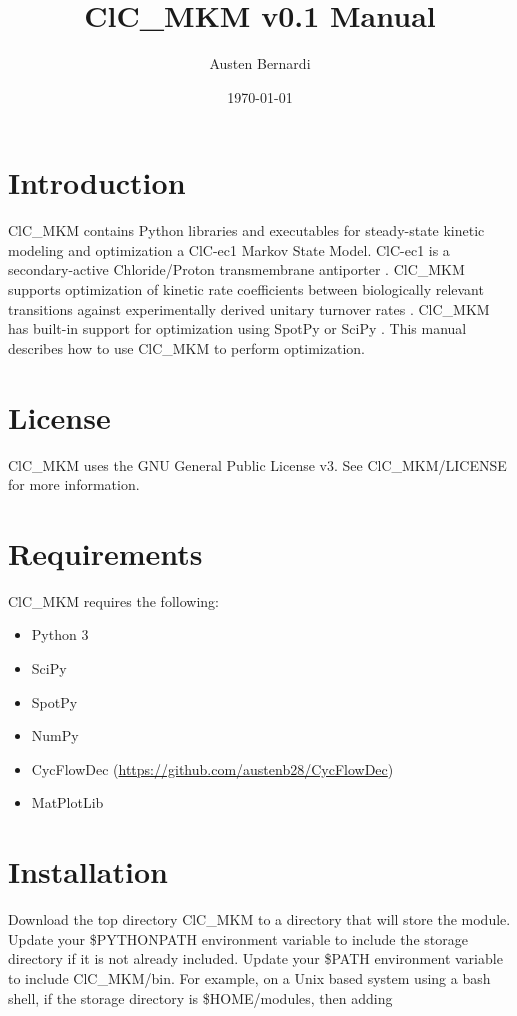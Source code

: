 \documentclass[12pt]{article}
\title{ClC\_MKM v0.1 Manual}
\author{Austen Bernardi}
\date{\today}
\newcommand{\parameters}[1]{{\fontfamily{pcr}\selectfont#1}}
\newcommand{\hrefc}[2]{\href{#1}{\color{blue}#2}}
\begin{document}
\maketitle{}

\tableofcontents
\clearpage
\newpage

\section{Introduction}

ClC\_MKM contains Python libraries and executables for steady-state kinetic modeling and optimization a ClC-ec1 Markov State Model. ClC-ec1 is a secondary-active Chloride/Proton transmembrane antiporter \cite{mayes2018multiscale}. ClC\_MKM supports optimization of kinetic rate coefficients between biologically relevant transitions against experimentally derived unitary turnover rates \cite{lim2009intracellular}. ClC\_MKM has built-in support for optimization using SpotPy \cite{houska2015spotting} or SciPy \cite{virtanen2020scipy}. This manual describes how to use ClC\_MKM to perform optimization.

\section{License}
ClC\_MKM uses the GNU General Public License v3.  See \parameters{ClC\_MKM/LICENSE} for more information.

\section{Requirements}
ClC\_MKM requires the following:

\begin{itemize}
\item Python 3
\item SciPy \cite{virtanen2020scipy}
\item SpotPy \cite{houska2015spotting}
\item NumPy
\item CycFlowDec \cite{bernardi2021cycflowdec} (\hrefc{https://github.com/austenb28/CycFlowDec}{https://github.com/austenb28/CycFlowDec})
\item MatPlotLib
\end{itemize}

\section{Installation}
Download the top directory \parameters{ClC\_MKM} to a directory that will store the module. Update your \parameters{\$PYTHONPATH} environment variable to include the storage directory if it is not already included. Update your \parameters{\$PATH} environment variable to include \parameters{ClC\_MKM/bin}. For example, on a Unix based system using a bash shell, if the storage directory is \parameters{\$HOME/modules}, then adding \\
\end{document}
